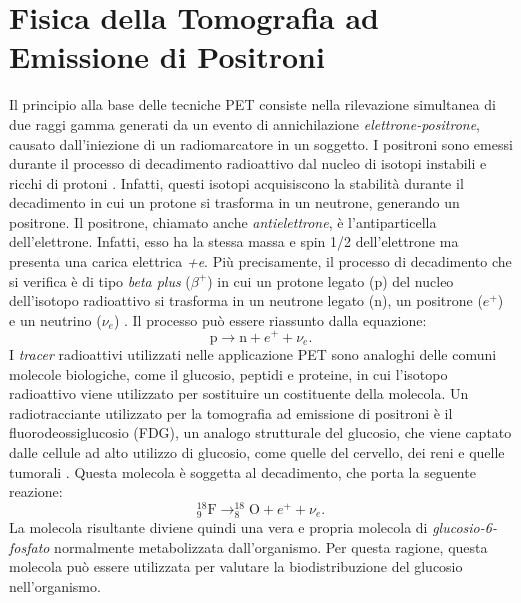 \chapter{Fisica della Tomografia ad Emissione di Positroni}
Il principio alla base delle tecniche PET consiste nella rilevazione simultanea di due raggi gamma generati da un evento di annichilazione \textit{elettrone-positrone}, causato dall'iniezione di un radiomarcatore in un soggetto. I positroni sono emessi durante il processo di decadimento radioattivo dal nucleo di isotopi instabili e ricchi di protoni \cite{Bailey2014}. Infatti, questi isotopi acquisiscono la stabilità durante il decadimento in cui un protone si trasforma in un neutrone, generando un positrone. Il positrone, chiamato anche \textit{antielettrone}, è l'antiparticella dell'elettrone. Infatti, esso ha la stessa massa e spin 1/2 dell'elettrone ma presenta una carica elettrica \textit{+e}. Più precisamente, il processo di decadimento che si verifica è di tipo \textit{beta plus} ($\beta^+$) in cui un protone legato (p) del nucleo dell'isotopo radioattivo si trasforma in un neutrone legato (n), un positrone ($e^+$) e un neutrino ($\nu_e$) \cite{Betaplus}. Il processo può essere riassunto dalla equazione:
\begin{equation}
	\text{p}\to \text{n} + e^+ + \nu_e.
\end{equation}
I \textit{tracer} radioattivi utilizzati nelle applicazione PET sono analoghi delle comuni molecole biologiche, come il glucosio, peptidi e proteine, in cui l'isotopo radioattivo viene utilizzato per sostituire un costituente della molecola. Un radiotracciante utilizzato per la tomografia ad emissione di positroni è il fluorodeossiglucosio (FDG), un analogo strutturale del glucosio, che viene captato dalle cellule ad alto utilizzo di glucosio, come quelle del cervello, dei reni e quelle tumorali \cite{FDG}. Questa molecola è soggetta al decadimento, che porta la seguente reazione:
\begin{equation}
	^{18}_9\text{F}\to ^{18}_8\text{O} + e^+ + \nu_e.
\end{equation}
La molecola risultante diviene quindi una vera e propria molecola di \textit{glucosio-6-fosfato} normalmente metabolizzata dall'organismo. Per questa ragione, questa molecola può essere utilizzata per valutare la biodistribuzione del glucosio nell'organismo.

